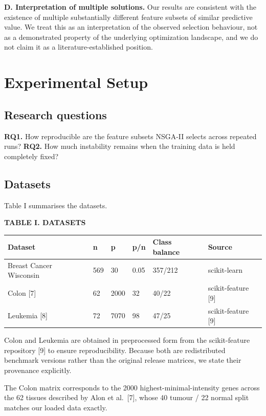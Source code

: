 \documentclass[conference]{IEEEtran}
\begin{document}
\textbf{D. Interpretation of multiple solutions.} Our results are consistent with the existence of multiple substantially different feature subsets of similar predictive value. We treat this as an interpretation of the observed selection behaviour, not as a demonstrated property of the underlying optimization landscape, and we do not claim it as a literature-established position.



\section{Experimental Setup}

\subsection{Research questions}

\textbf{RQ1.} How reproducible are the feature subsets NSGA-II selects across repeated runs?
\textbf{RQ2.} How much instability remains when the training data is held completely fixed?

\subsection{Datasets}

Table I summarises the datasets.

\textbf{TABLE I. DATASETS}

\begin{table}[t]\centering\scriptsize
\begin{tabular}[]{@{}llllll@{}}
\hline
Dataset & n & p & p/n & Class balance & Source \\
\hline
\hline
Breast Cancer Wisconsin & 569 & 30 & 0.05 & 357/212 & scikit-learn \\
Colon [7] & 62 & 2000 & 32 & 40/22 & scikit-feature [9] \\
Leukemia [8] & 72 & 7070 & 98 & 47/25 & scikit-feature [9] \\
\end{tabular}
\end{table}


Colon and Leukemia are obtained in preprocessed form from the scikit-feature repository [9] to ensure reproducibility. Because both are redistributed benchmark versions rather than the original release matrices, we state their provenance explicitly.

The Colon matrix corresponds to the 2000 highest-minimal-intensity genes across the 62 tissues described by Alon et al.~[7], whose 40 tumour / 22 normal split matches our loaded data exactly.
\end{document}
